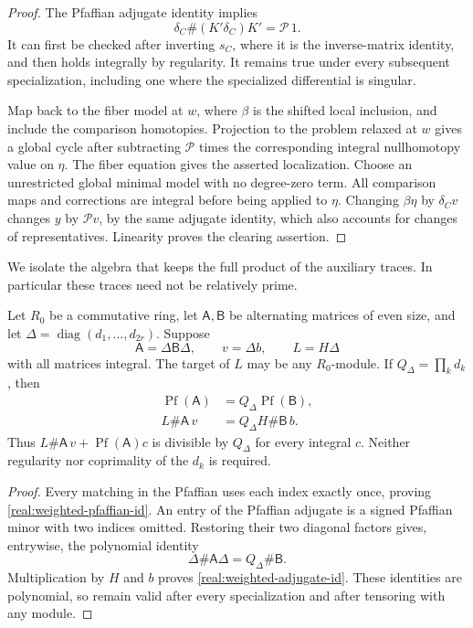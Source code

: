 \begin{proof}
The Pfaffian adjugate identity implies
\[
 \delta_C\#(K'\delta_C)K'=\mathcal P\,1.
\]
It can first be checked after inverting \(s_C\), where it is the
inverse-matrix identity, and then holds integrally by regularity.
It remains true under every subsequent specialization, including one
where the specialized differential is singular.

Map back to the fiber model at \(w\), where \(\beta\) is the shifted
local inclusion, and include the comparison homotopies. Projection to
the problem relaxed at \(w\) gives a global cycle after subtracting
\(\mathcal P\) times the corresponding integral nullhomotopy value
on \(\eta\). The fiber equation gives the asserted localization.
Choose an unrestricted global minimal model with no degree-zero
term. All comparison maps and corrections are integral before being
applied to \(\eta\). Changing \(\beta\eta\) by \(\delta_Cv\) changes
\(y\) by \(\mathcal P v\), by the same adjugate identity, which also
accounts for changes of representatives. Linearity proves the
clearing assertion.
\end{proof}

We isolate the algebra that keeps the full product of the auxiliary
traces. In particular these traces need not be relatively prime.

\begin{lemma}\label{real:weighted-pfaffian}
Let \(R_0\) be a commutative ring, let \(\mathsf A,\mathsf B\) be
alternating matrices of even size, and let
\(\Delta=\operatorname{diag}(d_1,\ldots,d_{2r})\). Suppose
\[
 \mathsf A=\Delta\mathsf B\Delta,\qquad v=\Delta b,
 \qquad L=H\Delta
\]
with all matrices integral. The target of \(L\) may be any
\(R_0\)-module. If \(Q_\Delta=\prod_kd_k\), then
\begin{align}
 \operatorname{Pf}(\mathsf A)&=Q_\Delta\operatorname{Pf}(\mathsf B),
 \label{real:weighted-pfaffian-id}\\
 L\#\mathsf A\,v&=Q_\Delta H\#\mathsf B\,b.
 \label{real:weighted-adjugate-id}
\end{align}
Thus \(L\#\mathsf A\,v+\operatorname{Pf}(\mathsf A)c\) is divisible
by \(Q_\Delta\) for every integral \(c\). Neither regularity nor
coprimality of the \(d_k\) is required.
\end{lemma}

\begin{proof}
Every matching in the Pfaffian uses each index exactly once, proving
\eqref{real:weighted-pfaffian-id}. An entry of the Pfaffian adjugate
is a signed Pfaffian minor with two indices omitted. Restoring their
two diagonal factors gives, entrywise, the polynomial identity
\[
 \Delta\#\mathsf A\Delta=Q_\Delta\#\mathsf B.
\]
Multiplication by \(H\) and \(b\) proves
\eqref{real:weighted-adjugate-id}. These identities are polynomial,
so remain valid after every specialization and after tensoring with
any module.
\end{proof}

